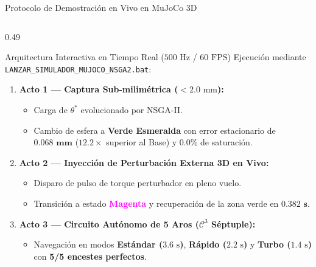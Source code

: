 \documentclass[aspectratio=169,9pt]{beamer}
\begin{document}
\begin{frame}{Protocolo de Demostración en Vivo en MuJoCo 3D}
\vspace{-0.18cm}
\begin{columns}[T,onlytextwidth]
\begin{column}{0.49\textwidth}
    \begin{block}{\footnotesize Arquitectura Interactiva en Tiempo Real ($500\text{ Hz}$ / $60\text{ FPS}$)}
        \scriptsize
        Ejecución mediante \texttt{LANZAR\_SIMULADOR\_MUJOCO\_NSGA2.bat}:
        \begin{enumerate}\setlength{\itemsep}{1pt}
            \item \textbf{Acto 1 — Captura Sub-milimétrica ($<2.0\text{ mm}$):}
            \begin{itemize}\setlength{\itemsep}{0.5pt}
                \item \scriptsize Carga de $\theta^*$ evolucionado por NSGA-II.
                \item \scriptsize Cambio de esfera a \textcolor{unigreen}{\textbf{Verde Esmeralda}} con error estacionario de $\mathbf{0.068\text{ mm}}$ ($12.2\times$ superior al Base) y $0.0\%$ de saturación.
            \end{itemize}
            \item \textbf{Acto 2 — Inyección de Perturbación Externa 3D en Vivo:}
            \begin{itemize}\setlength{\itemsep}{0.5pt}
                \item \scriptsize Disparo de pulso de torque perturbador en pleno vuelo.
                \item \scriptsize Transición a estado \textcolor{magenta}{\textbf{Magenta}} y recuperación de la zona verde en $\mathbf{0.382\text{ s}}$.
            \end{itemize}
            \item \textbf{Acto 3 — Circuito Autónomo de 5 Aros ($\mathcal{C}^3$ Séptuple):}
            \begin{itemize}\setlength{\itemsep}{0.5pt}
                \item \scriptsize Navegación en modos \textbf{Estándar ($3.6\text{ s}$)}, \textbf{Rápido ($2.2\text{ s}$)} y \textbf{Turbo ($1.4\text{ s}$)} con \textbf{5/5 encestes perfectos}.
            \end{itemize}

\end{enumerate}
\end{block}
\end{column}
\end{columns}
\end{frame}
\end{document}
